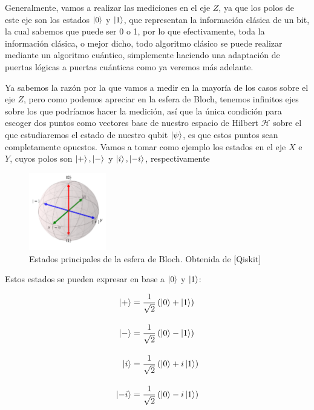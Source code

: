 \documentclass{article}
\numberwithin{equation}{section} %
\begin{document}
    \vspace{5mm}

    Generalmente, vamos a realizar las mediciones en el eje \( Z \), ya que los polos de este eje son los estados \( \ket{0} \) y \( \ket{1} \), que representan la información clásica de un bit, la cual sabemos que puede ser 0 o 1, por lo que efectivamente, toda la información clásica, o mejor dicho, todo algoritmo clásico se puede realizar mediante un algoritmo cuántico, simplemente haciendo una adaptación de puertas lógicas a puertas cuánticas como ya veremos más adelante. 

    \vspace{5mm}

    Ya sabemos la razón por la que vamos a medir en la mayoría de los casos sobre el eje \( Z \), pero como podemos apreciar en la esfera de Bloch, tenemos infinitos ejes sobre los que podríamos hacer la medición, así que la única condición para escoger dos puntos como vectores base de nuestro espacio de Hilbert \( \mathcal{H} \) sobre el que estudiaremos el estado de nuestro qubit \( \ket{\psi} \), es que estos puntos sean completamente opuestos. Vamos a tomar como ejemplo los estados en el eje \( X \) e \( Y \), cuyos polos son \( \ket{+}, \ket{-} \) y \( \ket{i}, \ket{-i} \), respectivamente

    \begin{figure}[H]
        \centering
        \includegraphics[width=0.3\textwidth]{img/bloch_other_bases.png}
        \caption{Estados principales de la esfera de Bloch. Obtenida de [Qiskit]}\label{fig: bloch_other_bases}
    \end{figure}

    Estos estados se pueden expresar en base a \( \ket{0} \) y \( \ket{1} \):

    \begin{align}
        \label{eq: estados_eje_x_y}
        \ket{+} &= \frac{1}{\sqrt{2}} \left( \ket{0} + \ket{1} \right) \\[10pt]
        \ket{-} &= \frac{1}{\sqrt{2}} \left( \ket{0} - \ket{1} \right) \\[10pt]
        \ket{i} &= \frac{1}{\sqrt{2}} \left( \ket{0} + i\ket{1} \right) \\[10pt]
        \ket{-i} &= \frac{1}{\sqrt{2}} \left( \ket{0} - i\ket{1} \right)
    \end{align}
\end{document}
